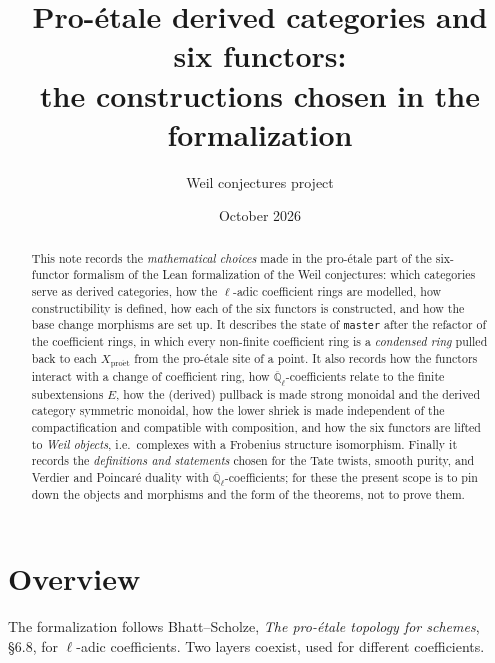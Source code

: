 \documentclass[11pt]{article}
\title{Pro-\'etale derived categories and six functors:\\
the constructions chosen in the formalization}
\author{Weil conjectures project}
\date{October 2026}
\theoremstyle{remark}
\newcommand{\proet}{\mathrm{pro\acute{e}t}}
\newcommand{\Qlbar}{\overline{\mathbb{Q}}_\ell}
\begin{document}
\maketitle

\begin{abstract}
This note records the \emph{mathematical choices} made in the pro-\'etale part of the
six-functor formalism of the Lean formalization of the Weil conjectures: which categories
serve as derived categories, how the $\ell$-adic coefficient rings are modelled, how
constructibility is defined, how each of the six functors is constructed, and how the base
change morphisms are set up. It describes the state of \texttt{master} after the refactor of
the coefficient rings, in which every non-finite coefficient ring is a \emph{condensed ring}
pulled back to each $X_\proet$ from the pro-\'etale site of a point. It also records how the
functors interact with a change of coefficient ring, how $\Qlbar$-coefficients relate to
the finite subextensions $E$, how the (derived) pullback is made strong monoidal and the
derived category symmetric monoidal, how the lower shriek is made independent of the
compactification and compatible with composition, and how the six functors are lifted to
\emph{Weil objects}, i.e.\ complexes with a Frobenius structure isomorphism. Finally it
records the \emph{definitions and statements} chosen for the Tate twists, smooth purity, and
Verdier and Poincar\'e duality with $\Qlbar$-coefficients; for these the present scope is to
pin down the objects and morphisms and the form of the theorems, not to prove them.
\end{abstract}

\tableofcontents

\section{Overview}

The formalization follows Bhatt--Scholze, \emph{The pro-\'etale topology for schemes},
\S6.8, for $\ell$-adic coefficients. Two layers coexist, used for different coefficients.
\end{document}
